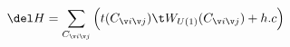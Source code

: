 \begin{equation}
 \del H =\sum_{C_{\v i\v j}}
 \Big( t(C_{\v i\v j}) \t W_{U(1)}(C_{\v i\v j}) +h.c \Big)
\end{equation}


